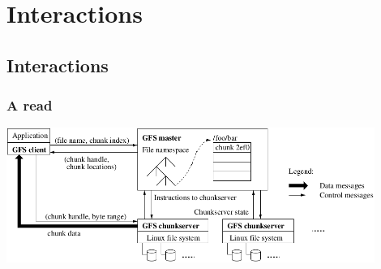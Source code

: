 \documentclass{beamer}
\newcommand{\slidewidth}{12cm}
\begin{document}
\section{Interactions}
\subsection{Interactions}
\begin{frame}
 \frametitle{A read}
 \centering
 \includegraphics[width=\slidewidth]{figures/GFSarchitecture.png}
\end{frame}
\end{document}
